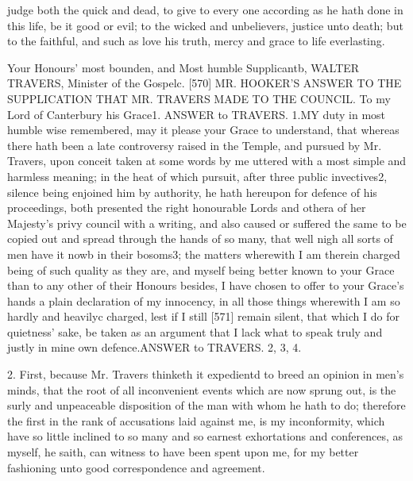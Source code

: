 judge both the quick and dead, to give to every one according as he hath done in this life, be it good or evil; to the wicked and unbelievers, justice unto death; but to the faithful, and such as love his truth, mercy and grace to life everlasting.

Your Honours’ most bounden, and 
Most humble Supplicantb,
WALTER TRAVERS, 
Minister of the Gospelc.
[570]
MR. HOOKER’S ANSWER TO THE SUPPLICATION THAT MR. TRAVERS MADE TO THE COUNCIL.
To my Lord of Canterbury his Grace1.
ANSWER to TRAVERS. 1.MY duty in most humble wise remembered, may it please your Grace to understand, that whereas there hath been a late controversy raised in the Temple, and pursued by Mr. Travers, upon conceit taken at some words by me uttered with a most simple and harmless meaning; in the heat of which pursuit, after three public invectives2, silence being enjoined him by authority, he hath hereupon for defence of his proceedings, both presented the right honourable Lords and othera of her Majesty’s privy council with a writing, and also caused or suffered the same to be copied out and spread through the hands of so many, that well nigh all sorts of men have it nowb in their bosoms3; the matters wherewith I am therein charged being of such quality as they are, and myself being better known to your Grace than to any other of their Honours besides, I have chosen to offer to your Grace’s hands a plain declaration of my innocency, in all those things wherewith I am so hardly and heavilyc charged, lest if I still [571] remain silent, that which I do for quietness’ sake, be taken as an argument that I lack what to speak truly and justly in mine own defence.ANSWER to TRAVERS. 2, 3, 4.

2. First, because Mr. Travers thinketh it expedientd to breed an opinion in men’s minds, that the root of all inconvenient events which are now sprung out, is the surly and unpeaceable disposition of the man with whom he hath to do; therefore the first in the rank of accusations laid against me, is my inconformity, which have so little inclined to so many and so earnest exhortations and conferences, as myself, he saith, can witness to have been spent upon me, for my better fashioning unto good correspondence and agreement.

